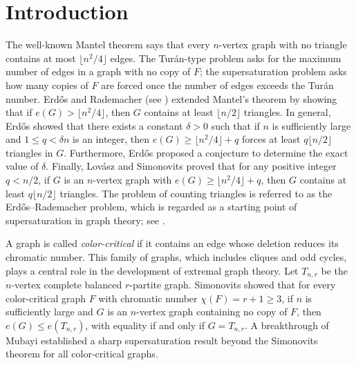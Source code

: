 \documentclass[11pt,a4paper]{article}
\theoremstyle{definition}
\theoremstyle{plain}
\renewcommand{\le}{\leqslant}
\renewcommand{\ge}{\geqslant}
\begin{document}



\section{Introduction}

 
The well-known Mantel theorem says that every $n$-vertex graph with no triangle contains at most $\lfloor n^2/4\rfloor$ edges.  
The Tur\'an-type problem asks for the maximum number of edges in a graph with no copy of $F$;  the supersaturation problem asks how many copies of $F$ are forced once the number of edges exceeds the Tur\'{a}n number.  Erd\H{o}s and Rademacher (see \cite{Erdos1964}) extended Mantel's theorem by showing that  
if $e(G)>  \lfloor n^2/4\rfloor$, 
then $G$ contains at least $ \lfloor {n}/{2}\rfloor$ triangles. 
In general,  Erd\H{o}s \cite{Erd1962a}
 showed that there exists a constant $\delta>0$ such that if  $n$ is sufficiently large and $1\le q<\delta n$ is an integer, then
 $e(G)\ge \lfloor n^2/4\rfloor +q$
 forces at least $q\lfloor {n}/{2}\rfloor$ triangles in $G$. 
Furthermore,  
 Erd\H{o}s proposed a conjecture to determine the exact value of $\delta$. 
Finally, 
Lov\'{a}sz and Simonovits \cite{LS1975,LS1983} proved that 
for any positive integer $q < {n}/{2}$,  
if $G$ is an $n$-vertex graph with 
$e(G)\ge \lfloor {n^2}/{4} \rfloor + q$,   
then $G$ contains at least $q \lfloor {n}/{2}\rfloor$ 
triangles. 
The problem of counting triangles  is  referred to as the Erd\H{o}s--Rademacher problem, 
which is regarded as a starting point of supersaturation in graph theory; see \cite{Rei2016, XK2021,LM2022-Erd-Rad,BC2023,LPS2020}.   



A graph is called {\it color-critical} if it contains an
edge whose deletion reduces its chromatic number.
 This family of graphs, which includes cliques and odd cycles, plays a central role in the
development of extremal graph theory. 
Let $T_{n,r}$ be the  $n$-vertex complete balanced $r$-partite graph. 
Simonovits \cite{Sim1966} showed that
for every  color-critical  graph $F$ with chromatic number $\chi (F)=r+1 \ge 3$,
if $n$ is sufficiently large and 
 $G$ is an $n$-vertex graph containing no copy of $F$, then
$ e(G) \le e(T_{n,r})$, with equality if and only if $G=T_{n,r}$.
A breakthrough of Mubayi \cite{Mub2010} established a sharp supersaturation result beyond the Simonovits theorem for all color-critical graphs. 
 
\end{document}
